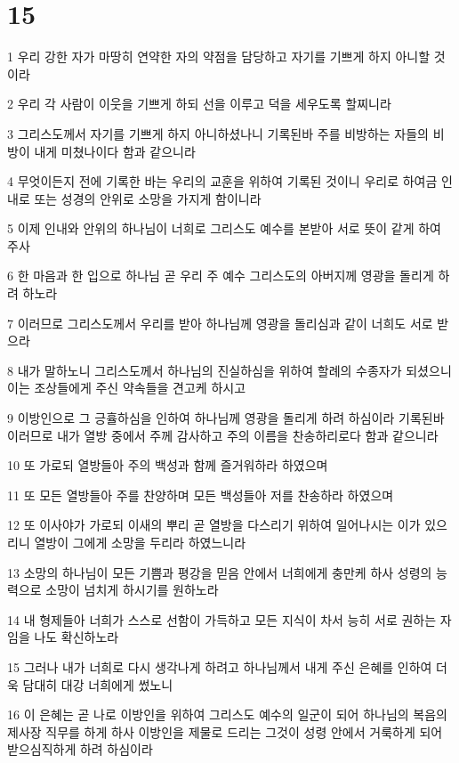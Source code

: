 \chapter{15}

\par 1 우리 강한 자가 마땅히 연약한 자의 약점을 담당하고 자기를 기쁘게 하지 아니할 것이라
\par 2 우리 각 사람이 이웃을 기쁘게 하되 선을 이루고 덕을 세우도록 할찌니라
\par 3 그리스도께서 자기를 기쁘게 하지 아니하셨나니 기록된바 주를 비방하는 자들의 비방이 내게 미쳤나이다 함과 같으니라
\par 4 무엇이든지 전에 기록한 바는 우리의 교훈을 위하여 기록된 것이니 우리로 하여금 인내로 또는 성경의 안위로 소망을 가지게 함이니라
\par 5 이제 인내와 안위의 하나님이 너희로 그리스도 예수를 본받아 서로 뜻이 같게 하여 주사
\par 6 한 마음과 한 입으로 하나님 곧 우리 주 예수 그리스도의 아버지께 영광을 돌리게 하려 하노라
\par 7 이러므로 그리스도께서 우리를 받아 하나님께 영광을 돌리심과 같이 너희도 서로 받으라
\par 8 내가 말하노니 그리스도께서 하나님의 진실하심을 위하여 할례의 수종자가 되셨으니 이는 조상들에게 주신 약속들을 견고케 하시고
\par 9 이방인으로 그 긍휼하심을 인하여 하나님께 영광을 돌리게 하려 하심이라 기록된바 이러므로 내가 열방 중에서 주께 감사하고 주의 이름을 찬송하리로다 함과 같으니라
\par 10 또 가로되 열방들아 주의 백성과 함께 즐거워하라 하였으며
\par 11 또 모든 열방들아 주를 찬양하며 모든 백성들아 저를 찬송하라 하였으며
\par 12 또 이사야가 가로되 이새의 뿌리 곧 열방을 다스리기 위하여 일어나시는 이가 있으리니 열방이 그에게 소망을 두리라 하였느니라
\par 13 소망의 하나님이 모든 기쁨과 평강을 믿음 안에서 너희에게 충만케 하사 성령의 능력으로 소망이 넘치게 하시기를 원하노라
\par 14 내 형제들아 너희가 스스로 선함이 가득하고 모든 지식이 차서 능히 서로 권하는 자임을 나도 확신하노라
\par 15 그러나 내가 너희로 다시 생각나게 하려고 하나님께서 내게 주신 은혜를 인하여 더욱 담대히 대강 너희에게 썼노니
\par 16 이 은혜는 곧 나로 이방인을 위하여 그리스도 예수의 일군이 되어 하나님의 복음의 제사장 직무를 하게 하사 이방인을 제물로 드리는 그것이 성령 안에서 거룩하게 되어 받으심직하게 하려 하심이라

